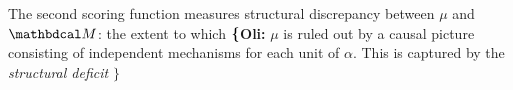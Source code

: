 \documentclass[twoside]{article}
\newcommand\voli[1]{{\color{olicolor}\textbf{$\boldsymbol\{$Oli: }#1 \textbf{$\boldsymbol\}$}}}
\begin{document}
The second scoring function measures
structural discrepancy between $\mu$ and $\dg M$:
the extent to which
\voli{$\mu$ is ruled out by
a causal picture consisting of independent mechanisms for each 
    {\color{red}unit of $\alpha$}.
This is captured by the \emph{structural deficit} }
\end{document}
